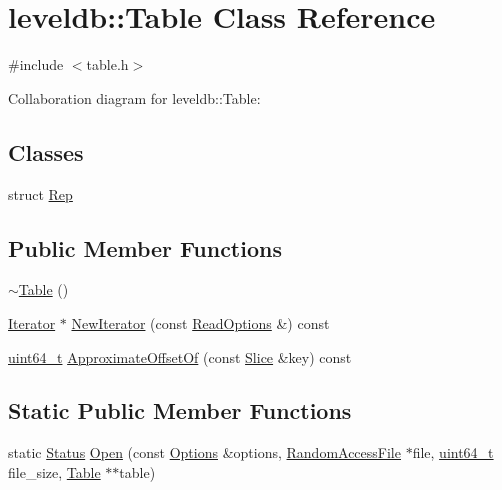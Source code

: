 \hypertarget{classleveldb_1_1_table}{\section{leveldb\-:\-:Table Class Reference}
\label{classleveldb_1_1_table}
}


{\ttfamily \#include $<$table.\-h$>$}



Collaboration diagram for leveldb\-:\-:Table\-:
\subsection*{Classes}
\begin{DoxyCompactItemize}
\item 
struct \hyperlink{structleveldb_1_1_table_1_1_rep}{Rep}
\end{DoxyCompactItemize}
\subsection*{Public Member Functions}
\begin{DoxyCompactItemize}
\item 
\hyperlink{classleveldb_1_1_table_a945f1f97b4f53402f5d55422a4dd3af2}{$\sim$\-Table} ()
\item 
\hyperlink{classleveldb_1_1_iterator}{Iterator} $\ast$ \hyperlink{classleveldb_1_1_table_ad354f57ece050ca0c5f42669b7c01cc2}{New\-Iterator} (const \hyperlink{structleveldb_1_1_read_options}{Read\-Options} \&) const 
\item 
\hyperlink{stdint_8h_aaa5d1cd013383c889537491c3cfd9aad}{uint64\-\_\-t} \hyperlink{classleveldb_1_1_table_a1795d45c54945ee7652b19e6ad6c030b}{Approximate\-Offset\-Of} (const \hyperlink{classleveldb_1_1_slice}{Slice} \&key) const 
\end{DoxyCompactItemize}
\subsection*{Static Public Member Functions}
\begin{DoxyCompactItemize}
\item 
static \hyperlink{classleveldb_1_1_status}{Status} \hyperlink{classleveldb_1_1_table_aa25d0e074ab4de46e583522a8c0e9582}{Open} (const \hyperlink{structleveldb_1_1_options}{Options} \&options, \hyperlink{classleveldb_1_1_random_access_file}{Random\-Access\-File} $\ast$file, \hyperlink{stdint_8h_aaa5d1cd013383c889537491c3cfd9aad}{uint64\-\_\-t} file\-\_\-size, \hyperlink{classleveldb_1_1_table}{Table} $\ast$$\ast$table)
\end{DoxyCompactItemize}
